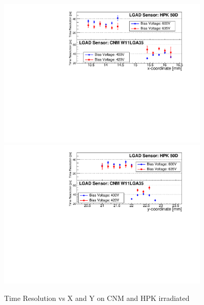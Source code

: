 \documentclass[preprint,1p]{elsarticle}
\begin{document}
\begin{figure}[htbp] 
\centering
\includegraphics[width=0.90\textwidth]{figs/USCSBoard_HPK50DIrradiated-CNMW11LGA35_Run936-961/IrradiatedSensorStudy_TimeResolution_vs_X.pdf} 
\includegraphics[width=0.90\textwidth]{figs/USCSBoard_HPK50DIrradiated-CNMW11LGA35_Run936-961/IrradiatedSensorStudy_TimeResolution_vs_Y.pdf} 
\caption{Time Resolution vs X and Y on CNM and HPK irradiated} 
\label{fig:Sensors} 
\end{figure} 
\end{document}
